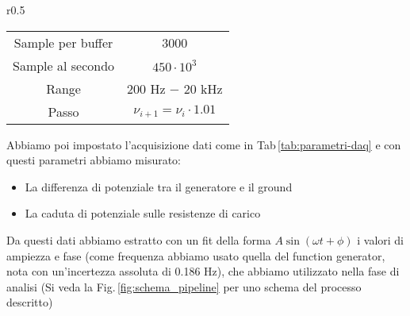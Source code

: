 \documentclass[../Relazione_circuiti]{subfiles}
\begin{document}
  \begin{wraptable}{r}{0.5\textwidth}
    \centering
    \begin{minipage}{0.43\textwidth}

      \centering
      \begin{tabular}{|c|c|}
        \hline
        Sample per buffer & 3000                           \\
        Sample al secondo & $ 450 \cdot 10^3 $                 \\
        Range             & 200 Hz − 20 kHz                \\
        Passo             & $\nu_{i+1} = \nu_i \cdot 1.01$ \\ \hline
      \end{tabular}

      \label{tab:parametri-daq}

    \end{minipage}

  \end{wraptable}

  Abbiamo poi impostato l'acquisizione dati come in Tab\,\ref{tab:parametri-daq} e con questi parametri abbiamo
  misurato:
  \begin{itemize}
    \item La differenza di potenziale tra il generatore e il ground
    \item La caduta di potenziale sulle resistenze di carico
  \end{itemize}

  Da questi dati abbiamo estratto con un fit della forma $ A \sin\left( \omega t + \phi \right) $ i valori di ampiezza e
  fase (come frequenza abbiamo usato quella del function generator, nota con un'incertezza assoluta di 0.186 Hz), che
  abbiamo utilizzato nella fase di analisi (Si veda la Fig.\,\ref{fig:schema_pipeline} per uno schema del processo
  descritto)

%
%
\end{document}
